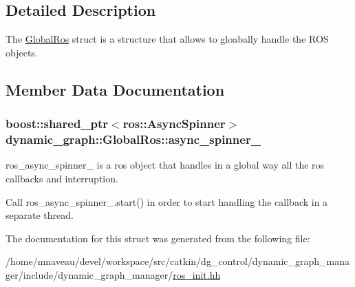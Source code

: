 \subsection{Detailed Description}
The \hyperlink{structdynamic__graph_1_1GlobalRos}{Global\+Ros} struct is a structure that allows to gloabally handle the R\+OS objects. 

\subsection{Member Data Documentation}
\subsubsection[{\texorpdfstring{async\+\_\+spinner\+\_\+}{async_spinner_}}]{\setlength{\rightskip}{0pt plus 5cm}boost\+::shared\+\_\+ptr$<$ros\+::\+Async\+Spinner$>$ dynamic\+\_\+graph\+::\+Global\+Ros\+::async\+\_\+spinner\+\_\+}\hypertarget{structdynamic__graph_1_1GlobalRos_a9ad45d4ac3a50e943d3f2cb24f8281a3}{}\label{structdynamic__graph_1_1GlobalRos_a9ad45d4ac3a50e943d3f2cb24f8281a3}


ros\+\_\+async\+\_\+spinner\+\_\+ is a ros object that handles in a global way all the ros callbacks and interruption. 

Call ros\+\_\+async\+\_\+spinner\+\_\+.\+start() in order to start handling the callback in a separate thread. 

The documentation for this struct was generated from the following file\+:\begin{DoxyCompactItemize}
\item 
/home/mnaveau/devel/workspace/src/catkin/dg\+\_\+control/dynamic\+\_\+graph\+\_\+manager/include/dynamic\+\_\+graph\+\_\+manager/\hyperlink{ros__init_8hh}{ros\+\_\+init.\+hh}\end{DoxyCompactItemize}
